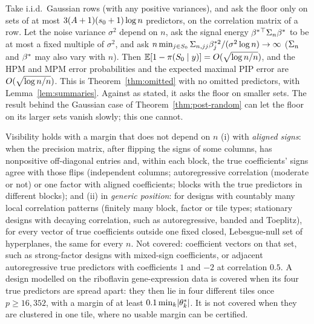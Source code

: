 \begin{remark}\label{rem:thm2x}
Take i.i.d.\ Gaussian rows (with any positive variances), and ask the floor only on sets of at most
$3(A+1)(s_0+1)\log n$ predictors, on the correlation matrix of a row. Let the noise variance $\sigma^2$ depend on $n$, ask
the signal energy $\beta^*{}^\top\Sigma_n\beta^*$ to be at most a fixed multiple of $\sigma^2$, and ask
$n\min_{j\in S_0}\Sigma_{n,jj}\beta^{*2}_j/(\sigma^2\log n)\to\infty$ ($\Sigma_n$ and $\beta^*$ may also vary with $n$). Then $\operatorname{\mathbb{E}}[1-\pi(S_0\mid y)]=O(\sqrt{\log n/n})$, and the HPM and MPM error probabilities and
the expected maximal PIP error are $O(\sqrt{\log n/n})$. This is Theorem~\ref{thm:omitted} with no omitted predictors, with
Lemma~\ref{lem:summaries}. Against  as stated, it asks the floor on smaller sets. The result behind the Gaussian
case of Theorem~\ref{thm:post-random} can let the floor on its larger sets vanish slowly; this one cannot.
\end{remark}


\begin{remark}\label{rem:vis}
Visibility holds with a margin that does not depend on $n$ (i) with \emph{aligned signs}: when the precision matrix,
after flipping the signs of some columns, has nonpositive off-diagonal entries and, within each block, the true
coefficients' signs agree with those flips (independent columns; autoregressive correlation (moderate or not) or one factor with aligned
coefficients; blocks with the true predictors in different blocks); and (ii) in \emph{generic position}: for designs with
countably many local correlation patterns (finitely many block, factor or tile types; stationary designs with decaying
correlation, such as autoregressive, banded and Toeplitz), for every vector of true coefficients outside one fixed closed,
Lebesgue-null set of hyperplanes, the same for every $n$. Not covered: coefficient vectors on that set, such as strong-factor designs with mixed-sign coefficients, or adjacent
autoregressive true predictors with coefficients $1$ and $-2$ at correlation $0.5$. A design modelled on the riboflavin
gene-expression data is covered when its four true predictors are spread apart: they then lie in four different tiles
once $p\ge16{,}352$, with a margin of at least $0.1\min_k\lvert \theta^*_k\rvert$. It is not covered when they are clustered
in one tile, where no usable margin can be certified.
\end{remark}

